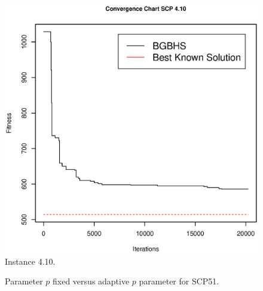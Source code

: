 \begin{figure}[]
\centering
\includegraphics[scale=.45]{Resultados/scp410.eps}
\caption{Instance 4.10.}
\label{fig:Instance.4.10}
\end{figure}

\begin{figure}[htp] 
    \centering
    \hfill%
        \caption{Parameter $p$ fixed versus adaptive $p$ parameter for SCP51.}
\end{figure}


